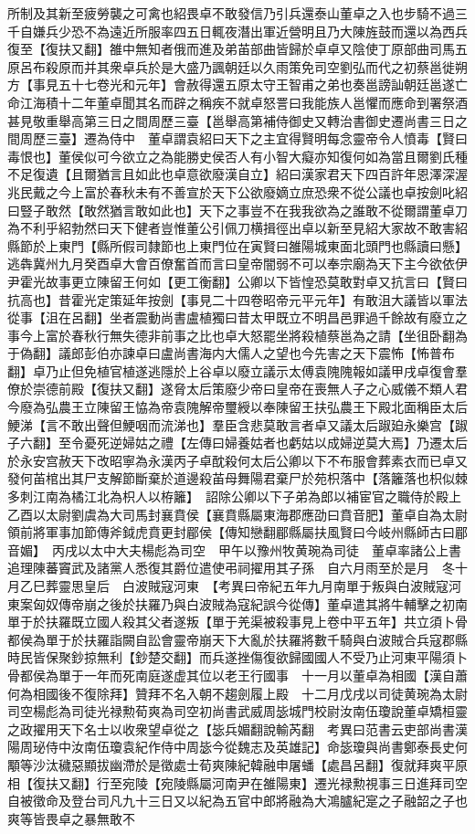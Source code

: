 所制及其新至疲勞襲之可禽也紹畏卓不敢發信乃引兵還泰山董卓之入也步騎不過三千自嫌兵少恐不為遠近所服率四五日輒夜潛出軍近營明且乃大陳旌鼓而還以為西兵復至【復扶又翻】雒中無知者俄而進及弟苖部曲皆歸於卓卓又陰使丁原部曲司馬五原呂布殺原而并其衆卓兵於是大盛乃諷朝廷以久雨策免司空劉弘而代之初蔡邕徙朔方【事見五十七卷光和元年】會赦得還五原太守王智甫之弟也奏邕謗訕朝廷邕遂亡命江海積十二年董卓聞其名而辟之稱疾不就卓怒詈曰我能族人邕懼而應命到署祭酒甚見敬重舉高第三日之間周歷三臺【邕舉高第補侍御史又轉治書御史遷尚書三日之間周歷三臺】遷為侍中　董卓謂袁紹曰天下之主宜得賢明每念靈帝令人憤毒【賢曰毒恨也】董侯似可今欲立之為能勝史侯否人有小智大癡亦知復何如為當且爾劉氏種不足復遺【且爾猶言且如此也卓意欲廢漢自立】紹曰漢家君天下四百許年恩澤深渥兆民戴之今上富於春秋未有不善宣於天下公欲廢嫡立庶恐衆不從公議也卓按劍叱紹曰豎子敢然【敢然猶言敢如此也】天下之事豈不在我我欲為之誰敢不從爾謂董卓刀為不利乎紹勃然曰天下健者豈惟董公引佩刀横揖徑出卓以新至見紹大家故不敢害紹縣節於上東門【縣所假司隸節也上東門位在寅賢曰雒陽城東面北頭門也縣讀曰懸】逃犇冀州九月癸酉卓大會百僚奮首而言曰皇帝闇弱不可以奉宗廟為天下主今欲依伊尹霍光故事更立陳留王何如【更工衡翻】公卿以下皆惶恐莫敢對卓又抗言曰【賢曰抗高也】昔霍光定策延年按劍【事見二十四卷昭帝元平元年】有敢沮大議皆以軍法從事【沮在呂翻】坐者震動尚書盧植獨曰昔太甲既立不明昌邑罪過千餘故有廢立之事今上富於春秋行無失德非前事之比也卓大怒罷坐將殺植蔡邕為之請【坐徂卧翻為于偽翻】議郎彭伯亦諫卓曰盧尚書海内大儒人之望也今先害之天下震怖【怖普布翻】卓乃止但免植官植遂逃隱於上谷卓以廢立議示太傅袁隗隗報如議甲戌卓復會羣僚於崇德前殿【復扶又翻】遂脅太后策廢少帝曰皇帝在喪無人子之心威儀不類人君今廢為弘農王立陳留王恊為帝袁隗解帝璽綬以奉陳留王扶弘農王下殿北面稱臣太后鯁涕【言不敢出聲但鯁咽而流涕也】羣臣含悲莫敢言者卓又議太后踧廹永樂宫【踧子六翻】至令憂死逆婦姑之禮【左傳曰婦養姑者也虧姑以成婦逆莫大焉】乃遷太后於永安宫赦天下改昭寧為永漢丙子卓酖殺何太后公卿以下不布服會葬素衣而已卓又發何苖棺出其尸支解節斷棄於道邊殺苖母舞陽君棄尸於苑枳落中【落籬落也枳似棘多刺江南為橘江北為枳人以栫籬】　詔除公卿以下子弟為郎以補宦官之職侍於殿上　乙酉以太尉劉虞為大司馬封襄賁侯【襄賁縣屬東海郡應劭曰賁音肥】董卓自為太尉領前將軍事加節傳斧鉞虎賁更封郿侯【傳知戀翻郿縣屬扶風賢曰今岐州縣師古曰郿音媚】　丙戌以太中大夫楊彪為司空　甲午以豫州牧黄琬為司徒　董卓率諸公上書追理陳蕃竇武及諸黨人悉復其爵位遣使弔祠擢用其子孫　自六月雨至於是月　冬十月乙巳葬靈思皇后　白波賊寇河東　【考異曰帝紀五年九月南單于叛與白波賊寇河東案匈奴傳帝崩之後於扶羅乃與白波賊為寇紀誤今從傳】董卓遣其將牛輔擊之初南單于於扶羅既立國人殺其父者遂叛【單于羌渠被殺事見上卷中平五年】共立須卜骨都侯為單于於扶羅詣闕自訟會靈帝崩天下大亂於扶羅將數千騎與白波賊合兵寇郡縣時民皆保聚鈔掠無利【鈔楚交翻】而兵遂挫傷復欲歸國國人不受乃止河東平陽須卜骨都侯為單于一年而死南庭遂虚其位以老王行國事　十一月以董卓為相國【漢自蕭何為相國後不復除拜】贊拜不名入朝不趨劍履上殿　十二月戊戌以司徒黄琬為太尉司空楊彪為司徒光禄勲荀爽為司空初尚書武威周毖城門校尉汝南伍瓊說董卓矯桓靈之政擢用天下名士以收衆望卓從之【毖兵媚翻說輸芮翻　考異曰范書云吏部尚書漢陽周珌侍中汝南伍瓊袁紀作侍中周毖今從魏志及英雄記】命毖瓊與尚書鄭泰長史何顒等沙汰穢惡顯拔幽滯於是徵處士荀爽陳紀韓融申屠蟠【處昌呂翻】復就拜爽平原相【復扶又翻】行至宛陵【宛陵縣屬河南尹在雒陽東】遷光禄勲視事三日進拜司空自被徵命及登台司凡九十三日又以紀為五官中郎將融為大鴻臚紀寔之子融韶之子也爽等皆畏卓之暴無敢不